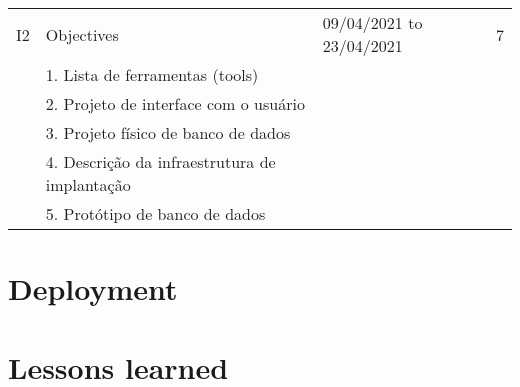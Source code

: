 \begin{adjustbox}{width=\textwidth}
\begin{tabular}{|l|l|l|l|}
I2        & Objectives                    & 09/04/2021 to 23/04/2021 & 7               \\
          & 1. Lista de ferramentas (tools)               &          &                 \\
          & 2. Projeto de interface com o usuário         &          &                 \\
          & 3. Projeto físico de banco de dados           &          &                 \\
          & 4. Descrição da infraestrutura de implantação &          &                 \\
          & 5. Protótipo de banco de dados                &          &                 \\ \hline          
\end{tabular}
\end{adjustbox}

\section*{Deployment}

\section*{Lessons learned}
